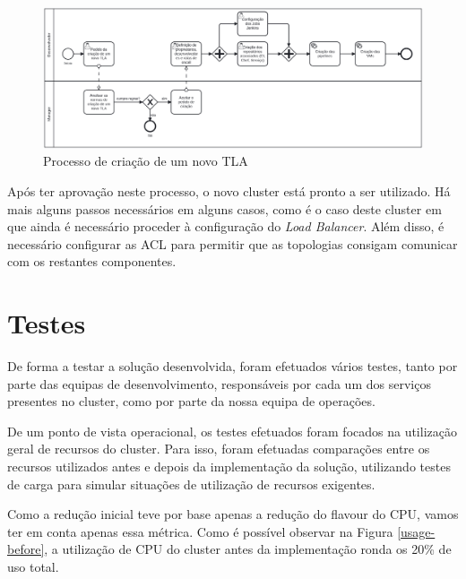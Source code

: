 \begin{figure}[H]
  \centerline{\includegraphics[scale=0.13]{media/content/impl/create-tla.png}}
  \caption{Processo de criação de um novo TLA}
  \label{create-tla}
\end{figure}

Após ter aprovação neste processo, o novo \gls{cluster} está pronto a ser utilizado. Há mais 
alguns passos necessários em alguns casos, como é o caso deste \gls{cluster} em que ainda é
necessário proceder à configuração do \textit{Load Balancer}. Além disso, é necessário 
configurar as \ac{ACL} para permitir que as topologias consigam comunicar com os restantes
componentes.

\section{Testes}

De forma a testar a solução desenvolvida, foram efetuados vários testes, tanto por parte das
equipas de desenvolvimento, responsáveis por cada um dos serviços presentes no \gls{cluster},
como por parte da nossa equipa de operações. 

De um ponto de vista operacional, os testes efetuados foram focados na utilização geral de
recursos do \gls{cluster}. Para isso, foram efetuadas comparações entre os recursos utilizados
antes e depois da implementação da solução, utilizando testes de carga para simular situações
de utilização de recursos exigentes.

Como a redução inicial teve por base apenas a redução do \gls{flavour} do \ac{CPU}, vamos ter em conta
apenas essa métrica. Como é possível observar na Figura \ref{usage-before}, a utilização de \ac{CPU}
do \gls{cluster} antes da implementação ronda os 20\% de uso total.

